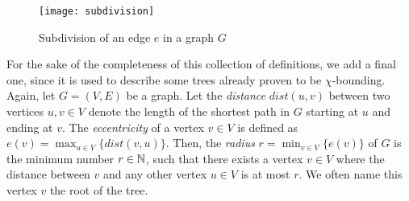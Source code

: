 \begin{figure}[ht]
\begin{center}
\texttt{[image: subdivision]}
\end{center}
\caption{Subdivision of an edge $e$ in a graph $G$}
\label{f2ba}
\end{figure}


For the sake of the completeness of this collection of definitions, we add a final one, since it is used to describe some trees already proven to be $\chi$-bounding. Again, let $G=(V,E)$ be a graph. Let the \textit{distance} $dist(u,v)$ between two vertices $u,v\in V$ denote the length of the shortest path in $G$ starting at $u$ and ending at $v$. The \textit{eccentricity} of a vertex $v\in V$ is defined as $\displaystyle e(v)=\max_{u \in V}\lbrace dist(v,u)\rbrace$. Then, the \textit{radius} $\displaystyle r= \min_{v\in V}\lbrace e(v)\rbrace$ of $G$ is the minimum number $r\in\mathbb{N}$, such that there exists a vertex $v\in V$ where the distance between $v$ and any other vertex $u\in V$ is at most $r$. We often name this vertex $v$ the root of the tree.